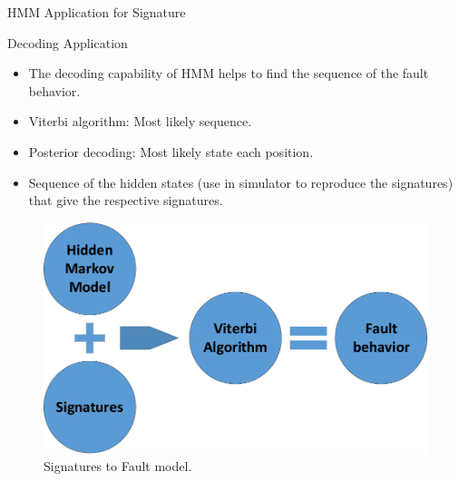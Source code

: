 \documentclass[aspectratio=1610]{beamer}
\begin{document}
\begin{frame}{HMM Application for Signature}

\begin{block}{Decoding Application}
\end{block}
\begin{itemize}
\item The decoding capability of HMM helps to find the sequence of the fault behavior.
\item Viterbi algorithm: Most likely sequence.
\item Posterior decoding: Most likely state each position.
\item Sequence of the hidden states (use in simulator to reproduce the signatures) that give the respective signatures.

\end{itemize}


\begin{figure}[tb!]
 \centering
  \captionsetup{justification=centering}    
   \includegraphics[scale=0.3]{Figures/HMM-plus-viterbi.pdf}
   \caption{Signatures to Fault model.}
\label{fig:HMMsig-Vit}
\end{figure}

\end{frame}
\end{document}

